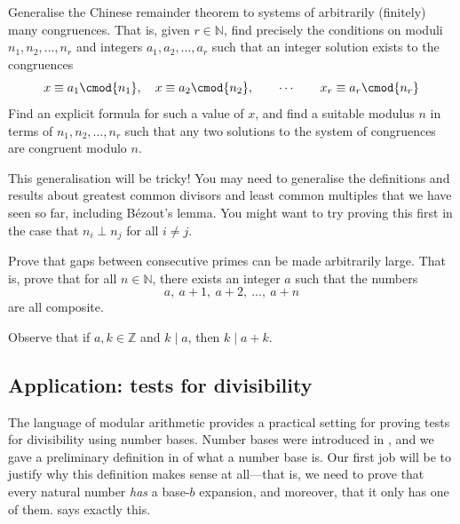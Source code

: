 \begin{oexercise}
\label{exGeneralisedCRT}
Generalise the Chinese remainder theorem to systems of arbitrarily (finitely) many congruences. That is, given $r \in \mathbb{N}$, find precisely the conditions on moduli $n_1,n_2,\dots,n_r$ and integers $a_1,a_2,\dots,a_r$ such that an integer solution exists to the congruences
\[ x \equiv a_1 \cmod{n_1}, \quad x \equiv a_2 \cmod{n_2}, \qquad \cdots \qquad x_r \equiv a_r \cmod{n_r} \]
Find an explicit formula for such a value of $x$, and find a suitable modulus $n$ in terms of $n_1,n_2,\dots,n_r$ such that any two solutions to the system of congruences are congruent modulo $n$.
\begin{backhint}
This generalisation will be tricky! You may need to generalise the definitions and results about greatest common divisors and least common multiples that we have seen so far, including B\'{e}zout's lemma. You might want to try proving this first in the case that $n_i \perp n_j$ for all $i \ne j$.
\end{backhint}
\end{oexercise}

\begin{exercise}
\label{exGapsBetweenPrimesLarge}
Prove that gaps between consecutive primes can be made arbitrarily large. That is, prove that for all $n \in \mathbb{N}$, there exists an integer $a$ such that the numbers
\[ a,\ a+1,\ a+2,\ \dots,\ a+n \]
are all composite.
\begin{backhint}
Observe that if $a,k \in \mathbb{Z}$ and $k \mid a$, then $k \mid a+k$.
\end{backhint}
\end{exercise}

\subsection*{Application: tests for divisibility}

The language of modular arithmetic provides a practical setting for proving tests for divisibility using number bases. Number bases were introduced in , and we gave a preliminary definition in  of what a number base is. Our first job will be to justify why this definition makes sense at all---that is, we need to prove that every natural number \textit{has} a base-$b$ expansion, and moreover, that it only has one of them.  says exactly this.

